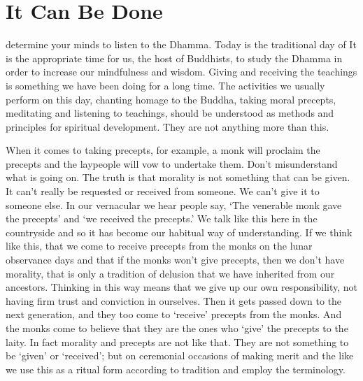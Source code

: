 
\chapter{It Can Be Done}

 determine your minds to listen to the Dhamma. Today is the traditional day of  It is the appropriate time for us, the host of Buddhists, to study the Dhamma in order to increase our mindfulness and wisdom. Giving and receiving the teachings is something we have been doing for a long time. The activities we usually perform on this day, chanting homage to the Buddha, taking moral precepts, meditating and listening to teachings, should be understood as methods and principles for spiritual development. They are not anything more than this. 

When it comes to taking precepts, for example, a monk will proclaim the precepts and the laypeople will vow to undertake them. Don't misunderstand what is going on. The truth is that morality is not something that can be given. It can't really be requested or received from someone. We can't give it to someone else. In our vernacular we hear people say, `The venerable monk gave the precepts' and `we received the precepts.' We talk like this here in the countryside and so it has become our habitual way of understanding. If we think like this, that we come to receive precepts from the monks on the lunar observance days and that if the monks won't give precepts, then we don't have morality, that is only a tradition of delusion that we have inherited from our ancestors. Thinking in this way means that we give up our own responsibility, not having firm trust and conviction in ourselves. Then it gets passed down to the next generation, and they too come to `receive' precepts from the monks. And the monks come to believe that they are the ones who `give' the precepts to the laity. In fact morality and precepts are not like that. They are not something to be `given' or `received'; but on ceremonial occasions of making merit and the like we use this as a ritual form according to tradition and employ the terminology. 

